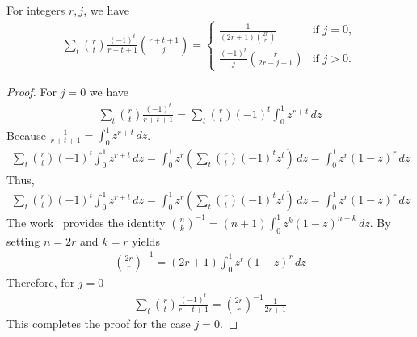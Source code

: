 ﻿\begin{lemma}
    \label{lem:altering-binomial-identity}
    For integers $r, j$, we have
    \begin{align*}
        \sum_{t} \binom{r}{t} \frac{(-1)^t}{r+t+1} \binom{r+t+1}{j}
        = \begin{cases}
              \displaystyle \frac{1}{(2r+1) \binom{2r}{r}} & \text{if } j=0, \\[0.8em]
              \displaystyle \frac{(-1)^r}{j} \binom{r}{2r-j+1} & \text{if } j>0.
        \end{cases}
    \end{align*}
    \begin{proof}
        For $j=0$ we have
        \begin{align*}
            \sum_t \binom{r}{t} \frac{(-1)^t}{r+t+1} = \sum_t \binom{r}{t} (-1)^t \int_0^1 z^{r+t} \, dz
        \end{align*}
        Because $\frac{1}{r+t+1} = \int_0^1 z^{r+t} \, dz$.
        \begin{align*}
            \sum_t \binom{r}{t} (-1)^t \int_0^1 z^{r+t} \, dz
            = \int_0^1 z^r \left( \sum_t \binom{r}{t} (-1)^t z^{t} \right) \, dz
            = \int_0^1 z^r (1 - z)^r \, dz
        \end{align*}
        Thus,
        \begin{align*}
            \sum_t \binom{r}{t} (-1)^t \int_0^1 z^{r+t} \, dz
            = \int_0^1 z^r \left( \sum_t \binom{r}{t} (-1)^t z^{t} \right) \, dz
            = \int_0^1 z^r (1 - z)^r \, dz
        \end{align*}
        The work~\cite{sury2004identities} provides the identity $\binom{n}{k}^{-1}=(n+1)\int_0^1z^k(1-z)^{n-k}\,dz$.
        By setting $n=2r$ and $k=r$ yields
        \begin{align*}
            \binom{2r}{r}^{-1}=(2r+1) \int_0^1 z^r (1-z)^{r}\,dz
        \end{align*}
        Therefore, for $j=0$
        \begin{align*}
            \sum_t \binom{r}{t} \frac{(-1)^t}{r+t+1} = \binom{2r}{r}^{-1} \frac{1}{2r+1}
        \end{align*}
        This completes the proof for the case $j=0$.


\end{proof}
\end{lemma}
